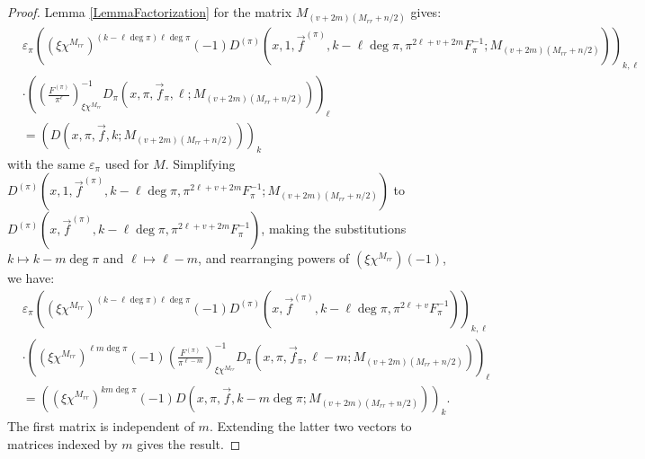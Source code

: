 \documentclass[11pt,letterpaper]{article}
\theoremstyle{definition}
\theoremstyle{remark}
\numberwithin{equation}{section}
\theoremstyle{dotless}
\newcommand{\res}[2]{\left(\frac{#1}{#2}\right)}
\begin{document}
\begin{proof}
Lemma \ref{LemmaFactorization} for the matrix $M_{(v+2m)(M_{rr}+n/2)}$ gives:
\begin{equation*}
\begin{split}
&\varepsilon_\pi \left( (\xi \chi^{M_{rr}})^{(k-\ell\deg \pi)\ell \deg \pi} (-1)  D^{(\pi)}(x, 1, \vec{f}^{(\pi)}, k-\ell \deg \pi, \pi^{2\ell+v+2m}F_\pi^{-1}; M_{(v+2m)(M_{rr}+n/2)}) \right)_{k, \ell} \\
&\cdot \left( \res{F^{(\pi)}}{\pi^\ell}_{\xi \chi^{M_{rr}}}^{-1}D_\pi(x, \pi, \vec{f}_\pi, \ell; M_{(v+2m)(M_{rr}+n/2)}) \right)_\ell \\
&= \left( D(x, \pi, \vec{f}, k; M_{(v+2m)(M_{rr}+n/2)}) \right)_k
\end{split}
\end{equation*}
with the same $\varepsilon_\pi$ used for $M$. Simplifying $D^{(\pi)}(x, 1, \vec{f}^{(\pi)}, k-\ell \deg \pi, \pi^{2\ell+v+2m}F_\pi^{-1}; M_{(v+2m)(M_{rr}+n/2)})$ to $D^{(\pi)}(x, \vec{f}^{(\pi)}, k-\ell \deg \pi, \pi^{2\ell+v+2m}F_\pi^{-1})$, making the substitutions $k \mapsto k-m\deg \pi$ and $\ell \mapsto \ell-m$, and rearranging powers of $(\xi\chi^{M_{rr}})(-1)$, we have:
\begin{equation*}
\begin{split}
&\varepsilon_\pi \left( (\xi\chi^{M_{rr}})^{(k-\ell\deg \pi)\ell \deg \pi} (-1)  D^{(\pi)}(x, \vec{f}^{(\pi)}, k-\ell \deg \pi, \pi^{2\ell+v}F_\pi^{-1}) \right)_{k, \ell} \\
&\cdot \left((\xi \chi^{M_{rr}})^{\ell m \deg \pi}(-1)\res{F^{(\pi)}}{\pi^{\ell-m}}_{\xi \chi^{M_{rr}}}^{-1} D_\pi(x, \pi, \vec{f}_\pi, \ell-m; M_{(v+2m)(M_{rr}+n/2)}) \right)_\ell \\
&= \left( (\xi \chi^{M_{rr}})^{k m \deg \pi}(-1)D(x, \pi, \vec{f}, k-m\deg \pi; M_{(v+2m)(M_{rr}+n/2)}) \right)_k .
\end{split}
\end{equation*}
The first matrix is independent of $m$. Extending the latter two vectors to matrices indexed by $m$ gives the result. 
\end{proof}
\end{document}
